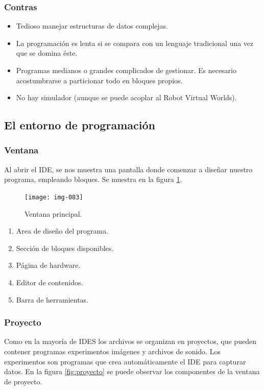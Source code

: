 \documentclass[12pt,a4paper]{article}
\begin{document}
\subsubsection{Contras}
\begin{itemize}
\item Tedioso manejar estructuras de datos complejas.
\item La programación es lenta si se compara con un lenguaje tradicional una vez
que se domina éste.
\item Programas medianos o grandes complicados de gestionar. Es necesario
acostumbrarse a particionar todo en bloques propios.
\item No hay simulador (aunque se puede acoplar al Robot Virtual Worlds).
\end{itemize}

\subsection{El entorno de programación}

\subsubsection{Ventana}
Al abrir el IDE, se nos muestra una pantalla donde comenzar a diseñar nuestro
programa, empleando bloques. Se muestra en la figura \ref{fig:principal}.

\begin{figure}[H]
	\caption{Ventana principal.\label{fig:principal}}
	\texttt{[image: img-083]}
	\centering
\end{figure}

\begin{enumerate}
\item Area de diseño del programa.
\item Sección de bloques disponibles.
\item Página de hardware.
\item Editor de contenidos.
\item Barra de herramientas.
\end{enumerate}

\subsubsection{Proyecto}

Como en la mayoría de IDES los archivos se organizan en proyectos, que pueden
contener programas experimentos imágenes y archivos de sonido. Los experimentos
son programas que crea automáticamente el IDE para capturar datos. En la figura
\ref{fig:proyecto} se puede observar los componentes de la ventana de proyecto.
\end{document}
